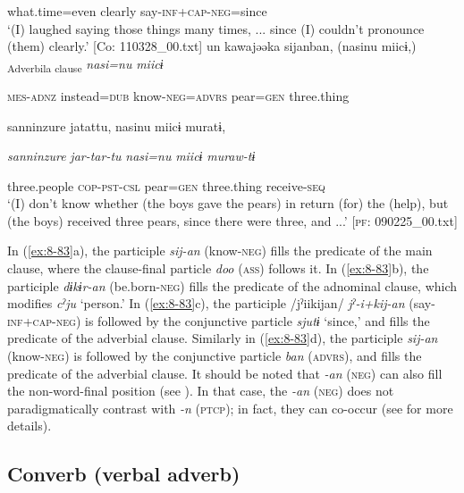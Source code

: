       what.time=even  clearly  say-\textsc{inf}+\textsc{cap}-\textsc{neg}=since\\
\glt ‘(I) laughed saying those things many times, ... since (I) couldn’t pronounce (them) clearly.’ [Co: 110328\_00.txt]
\ex
{\TM}
\glll  un  kawajəəka  sijanban,  (nasinu  miicɨ,)\\
[\textit{u-n}  \textit{kawajəə=ka}  \textit{sij-an=ban}]\textsubscript{Adverbila clause}  \textit{nasi=nu}  \textit{miicɨ}

      \textsc{mes}-\textsc{adnz}  instead=\textsc{dub}  know-\textsc{neg}=\textsc{advrs}  pear=\textsc{gen}  three.thing

      {\textbar}sanninzure{\textbar}  jatattu,  nasinu  miicɨ  muratɨ,

      \textit{sanninzure}  \textit{jar-tar-tu}  \textit{nasi=nu}  \textit{miicɨ}  \textit{muraw-tɨ}

      three.people  \textsc{cop}-\textsc{pst}-\textsc{csl}  pear=\textsc{gen}  three.thing  receive-\textsc{seq}\\
\glt ‘(I) don’t know whether (the boys gave the pears) in return (for) the (help), but (the boys) received three pears, since there were three, and ...’ [\textsc{pf}: 090225\_00.txt]
\z
\z

In (\ref{ex:8-83}a), the participle \textit{sij-an} (know-\textsc{neg}) fills the predicate of the main clause, where the clause-final particle \textit{doo} (\textsc{ass}) follows it. In (\ref{ex:8-83}b), the participle \textit{dɨkɨr-an} (be.born-\textsc{neg}) fills the predicate of the adnominal clause, which modifies \textit{cˀju} ‘person.’ In (\ref{ex:8-83}c), the participle /jˀiikijan/ \textit{jˀ-i+kij-an} (say-\textsc{inf}+\textsc{cap}-\textsc{neg}) is followed by the conjunctive particle \textit{sjutɨ} ‘since,’ and fills the predicate of the adverbial clause. Similarly in (\ref{ex:8-83}d), the participle \textit{sij-an} (know-\textsc{neg}) is followed by the conjunctive particle \textit{ban} (\textsc{advrs}), and fills the predicate of the adverbial clause. It should be noted that \textit{-an} (\textsc{neg}) can also fill the non-word-final position (see ). In that case, the \textit{-an} (\textsc{neg}) does not paradigmatically contrast with \textit{-n} (\textsc{ptcp}); in fact, they can co-occur (see  for more details).

\subsection{Converb (verbal adverb)}


